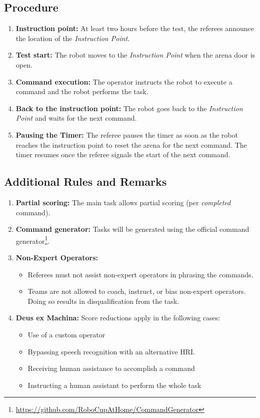 \subsection*{Procedure}
\begin{enumerate}[nosep]
	\item \textbf{Instruction point:} At least two hours before the test, the referees announce the location of the \textit{Instruction Point}.
	\item \textbf{Test start:} The robot moves to the \textit{Instruction Point} when the arena door is open.
	\item \textbf{Command execution:} The operator instructs the robot to execute a command and the robot performs the task.
	\item \textbf{Back to the instruction point:} The robot goes back to the \textit{Instruction Point} and waits for the next command.
	\item \textbf{Pausing the Timer:} The referee pauses the timer as soon as the robot reaches the instruction point to reset the arena for the next command. The timer resumes once the referee signals the start of the next command.
\end{enumerate}


\subsection*{Additional Rules and Remarks}
\begin{enumerate}[nosep]
	\item \textbf{Partial scoring:} The main task allows partial scoring (per \emph{completed} command).

	\item \textbf{Command generator:} Tasks will be generated using the official command generator\footnote{\url{https://github.com/RoboCupAtHome/CommandGenerator}}.

	\item \textbf{Non-Expert Operators:}
    \begin{itemize}[nosep]
        \item Referees must not assist non-expert operators in phrasing the commands.
        \item Teams are not allowed to coach, instruct, or bias non-expert operators. Doing so results in disqualification from the task.
    \end{itemize}

	\item \textbf{Deus ex Machina:} Score reductions apply in the following cases:
	\begin{itemize}
		\item Use of a custom operator
		\item Bypassing speech recognition with an alternative HRI.
		\item Receiving human assistance to accomplish a command 
		\item Instructing a human assistant to perform the whole task
	\end{itemize}
\end{enumerate}

